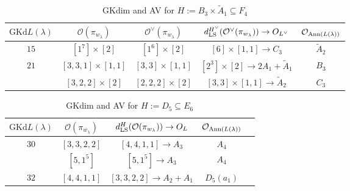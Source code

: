 \documentclass[reqno,12pt]{amsart}
\numberwithin{equation}{section}
\theoremstyle{plain}
\theoremstyle{definition}
\newcommand{\lam}{\lambda}
\renewcommand{\subset}{\subseteq}
\begin{document}
\begin{table}[htbp]\caption{ GKdim and AV for $H:=B_3\times \tilde{A}_1\subset F_4$}
	\label{tabb3a1}
	\centering
	\renewcommand{\arraystretch}{1.5}
	\setlength\tabcolsep{5pt}
	
{	\begin{tabular}{|c|c|c|c|c|}
		\hline $\mathrm{GKd} L(\lambda)$ &    $\mathcal{O}({\pi_{w_{\lam}}})$  &    $\mathcal{O}^{\vee}({\pi_{w_{\lam}}})$ &$d_{\rm LS}^{H^{\vee}}(\mathcal{O}^{\vee}(\pi_{w_\lambda}))\rightarrow    O_{L^\vee}$& $\mathcal{O}_{{\rm Ann}(L(\lambda))}$ \\ \hline


$15$ 
&  $ [1^7]\times [2]$ &  $ [1^6]\times [2]$ & \small{$[6]\times [1,1]\rightarrow C_3$ }&   $\tilde{A}_2$ \\
\hline

$21$&  $ [3,3,1]\times [1,1]$ &  $ [3,3]\times [1,1]$ & \small{$[2^3]\times [2]\rightarrow 2A_1+\tilde{A}_1$ }&   $B_3$ \\
&  $ [3,2,2]\times [2]$ &  $ [2,2,2]\times [2]$ & \small{$[3,3]\times [1,1]\rightarrow \tilde{A}_2$  }&   $C_3$ \\
\hline

\end{tabular}}
	\bigskip
	

\end{table}





\begin{table}[htbp]\caption{ GKdim and AV for $H:=D_5\subset E_6$}
	\label{tabd5-1}
	\centering
	\renewcommand{\arraystretch}{1.5}
	\setlength\tabcolsep{5pt}
	
	\begin{tabular}{|c|c|c|c|c|}
		\hline $\mathrm{GKd} L(\lambda)$ &     $\mathcal{O}({\pi_{w_{\lam}}})$& $d_{\rm LS}^{H}(\mathcal{O}(\pi_{w_\lambda}))\rightarrow O_{L}$ & $\mathcal{O}_{{\rm Ann}(L(\lambda))}$ \\ \hline
     $30$  &  $ [3,3,2,2] $  & $[4,4,1,1]\rightarrow  A_3 $     &   $ A_4$      \\
      &  $ [5,1^5] $  & $[5,1^5]\rightarrow  A_3 $     &   $ A_4$      \\
      \hline
        
         $ 32 $    &  $ [4,4,1,1] $  & $[3,3,2,2]\rightarrow A_2+A_1 $     &   $ D_5(a_1)$      \\\hline
        
\end{tabular}
	\bigskip
	
\end{table}
\end{document}

